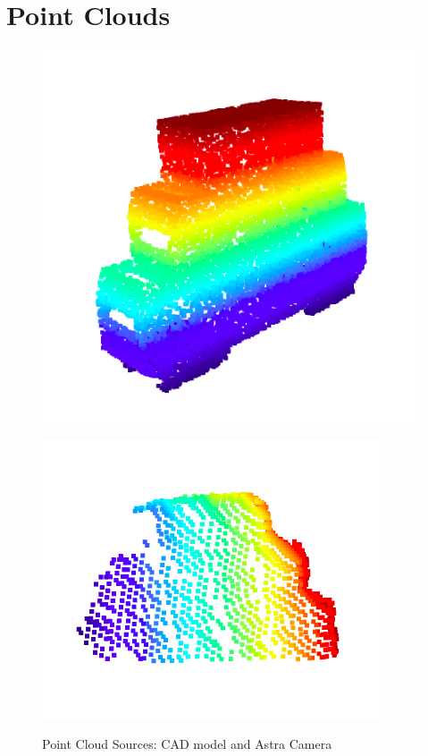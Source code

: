 \appendix
\chapter*{Point Clouds}
\label{chap:pointclouds}


\begin{figure}[htp]
\begin{center}
{
  \includegraphics[clip,width=0.6\columnwidth]{images/cad_cloud.png}
}
\end{center}
\begin{center}
{
  \includegraphics[clip,width=0.6\columnwidth]{images/astra_cloud.png}
}
\end{center}
\caption{Point Cloud Sources: CAD model and Astra Camera}
\label{}
\end{figure}





